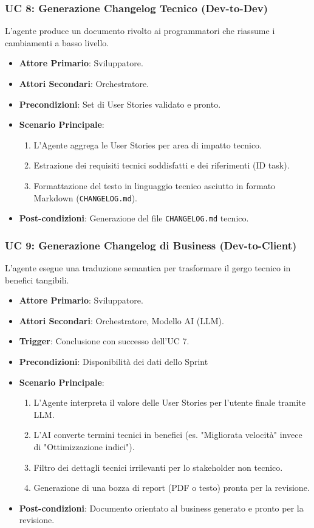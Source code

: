 \documentclass[12pt, a4paper]{article}
\begin{document}
\subsubsection{UC 8: Generazione Changelog Tecnico (Dev-to-Dev)}
L'agente produce un documento rivolto ai programmatori che riassume i cambiamenti a basso livello.
\begin{itemize}
\item \textbf{Attore Primario}: Sviluppatore.
\item \textbf{Attori Secondari}: Orchestratore.
\item \textbf{Precondizioni}: Set di User Stories validato e pronto.
\item \textbf{Scenario Principale}:
\begin{enumerate}
\item L'Agente aggrega le User Stories per area di impatto tecnico.
\item Estrazione dei requisiti tecnici soddisfatti e dei riferimenti (ID task).
\item Formattazione del testo in linguaggio tecnico asciutto in formato Markdown (\texttt{CHANGELOG.md}).
\end{enumerate}
\item \textbf{Post-condizioni}: Generazione del file \texttt{CHANGELOG.md} tecnico.
\end{itemize}

\subsubsection{UC 9: Generazione Changelog di Business (Dev-to-Client)}
L'agente esegue una traduzione semantica per trasformare il gergo tecnico in benefici tangibili.
\begin{itemize}
\item \textbf{Attore Primario}: Sviluppatore.
\item \textbf{Attori Secondari}: Orchestratore, Modello AI (LLM).
\item \textbf{Trigger}: Conclusione con successo dell'UC 7.
\item \textbf{Precondizioni}: Disponibilità dei dati dello Sprint
\item \textbf{Scenario Principale}:
\begin{enumerate}
\item L'Agente interpreta il valore delle User Stories per l'utente finale tramite LLM.
\item L'AI converte termini tecnici in benefici (es. "Migliorata velocità" invece di "Ottimizzazione indici").
\item Filtro dei dettagli tecnici irrilevanti per lo stakeholder non tecnico.
\item Generazione di una bozza di report (PDF o testo) pronta per la revisione.
\end{enumerate}
\item \textbf{Post-condizioni}: Documento orientato al business generato e pronto per la revisione.
\end{itemize}
\end{document}
